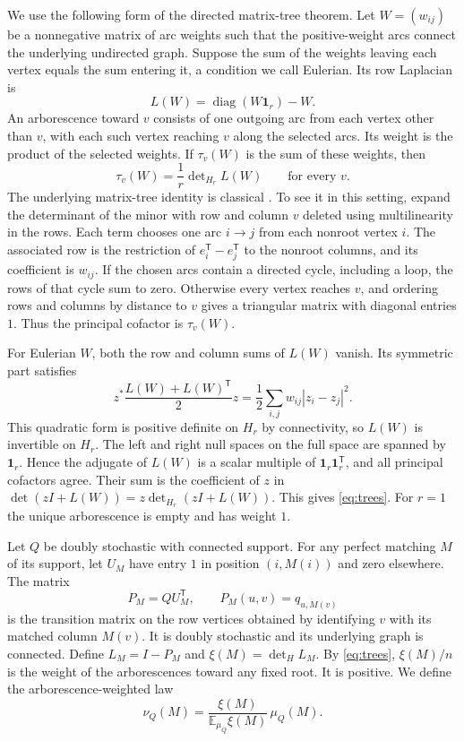 \documentclass[11pt]{article}
\newcommand{\E}{\mathbb{E}}
\newcommand{\one}{\mathbf{1}}
\newcommand{\trans}{\mathsf{T}}
\begin{document}
We use the following form of the directed matrix-tree theorem. Let \(W=(w_{ij})\) be a nonnegative matrix of arc weights such that the positive-weight arcs connect the underlying undirected graph. Suppose the sum of the weights leaving each vertex equals the sum entering it, a condition we call Eulerian. Its row Laplacian is
\[
 L(W)=\operatorname{diag}(W\one_r)-W.
\]
An arborescence toward \(v\) consists of one outgoing arc from each vertex other than \(v\), with each such vertex reaching \(v\) along the selected arcs. Its weight is the product of the selected weights. If \(\tau_v(W)\) is the sum of these weights, then
\begin{equation}\label{eq:trees}
 \tau_v(W)=\frac{1}{r}\det\nolimits_{H_r}L(W)
 \qquad\text{for every }v.
\end{equation}
The underlying matrix-tree identity is classical \cite{Chaiken}. To see it in this setting, expand the determinant of the minor with row and column \(v\) deleted using multilinearity in the rows. Each term chooses one arc \(i\to j\) from each nonroot vertex \(i\). The associated row is the restriction of \(e_i^{\trans}-e_j^{\trans}\) to the nonroot columns, and its coefficient is \(w_{ij}\). If the chosen arcs contain a directed cycle, including a loop, the rows of that cycle sum to zero. Otherwise every vertex reaches \(v\), and ordering rows and columns by distance to \(v\) gives a triangular matrix with diagonal entries \(1\). Thus the principal cofactor is \(\tau_v(W)\).

For Eulerian \(W\), both the row and column sums of \(L(W)\) vanish. Its symmetric part satisfies
\begin{equation}\label{eq:energy-general}
 z^*\frac{L(W)+L(W)^{\trans}}{2}z
   =\frac12\sum_{i,j}w_{ij}|z_i-z_j|^2.
\end{equation}
This quadratic form is positive definite on \(H_r\) by connectivity, so \(L(W)\) is invertible on \(H_r\). The left and right null spaces on the full space are spanned by \(\one_r\). Hence the adjugate of \(L(W)\) is a scalar multiple of \(\one_r\one_r^{\trans}\), and all principal cofactors agree. Their sum is the coefficient of \(z\) in \(\det(zI+L(W))=z\det_{H_r}(zI+L(W))\). This gives \eqref{eq:trees}. For \(r=1\) the unique arborescence is empty and has weight \(1\).

Let \(Q\) be doubly stochastic with connected support. For any perfect matching \(M\) of its support, let \(U_M\) have entry \(1\) in position \((i,M(i))\) and zero elsewhere. The matrix
\[
 P_M=QU_M^{\trans}, \qquad P_M(u,v)=q_{u,M(v)}
\]
is the transition matrix on the row vertices obtained by identifying \(v\) with its matched column \(M(v)\). It is doubly stochastic and its underlying graph is connected. Define \(L_M=I-P_M\) and \(\xi(M)=\det_H L_M\). By \eqref{eq:trees}, \(\xi(M)/n\) is the weight of the arborescences toward any fixed root. It is positive. We define the arborescence-weighted law
\begin{equation}\label{eq:nu}
 \nu_Q(M)=\frac{\xi(M)}{\E_{\mu_Q}\xi(M)}\,\mu_Q(M).
\end{equation}
\end{document}
